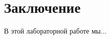 \documentclass[12pt]{report}
\begin{document}
	
	











\chapter*{Заключение}
В этой лабораторной работе мы...
\end{document}
